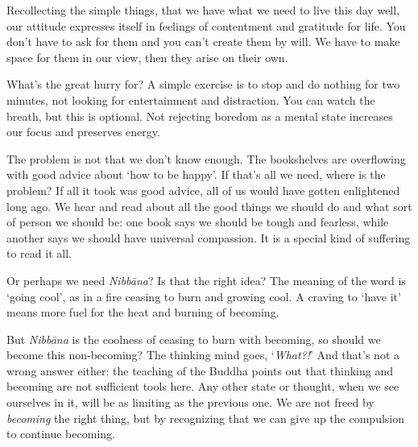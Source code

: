 Recollecting the simple things, that we have what we need to live this
day well, our attitude expresses itself in feelings of contentment and
gratitude for life. You don't have to ask for them and you can't create
them by will. We have to make space for them in our view, then they
arise on their own.

What's the great hurry for? A simple exercise is to stop and do nothing
for two minutes, not looking for entertainment and distraction. You can
watch the breath, but this is optional. Not rejecting boredom as a
mental state increases our focus and preserves energy.

The problem is not that we don't know enough. The bookshelves are
overflowing with good advice about `how to be happy'. If that's all we
need, where is the problem? If all it took was good advice, all of us
would have gotten enlightened long ago. We hear and read about all the
good things we should do and what sort of person we should be: one book
says we should be tough and fearless, while another says we should have
universal compassion. It is a special kind of suffering to read it all.

Or perhaps we need \emph{Nibbāna}? Is that the right idea? The meaning
of the word is `going cool', as in a fire ceasing to burn and growing
cool. A craving to `have it' means more fuel for the heat and burning of
becoming.

But \emph{Nibbāna} is the coolness of ceasing to burn with becoming, so
should we become this non-becoming? The thinking mind goes,
`\emph{What?!}' And that's not a wrong answer either: the teaching of
the Buddha points out that thinking and becoming are not sufficient
tools here. Any other state or thought, when we see ourselves in it,
will be as limiting as the previous one. We are not freed by
\emph{becoming} the right thing, but by recognizing that we can give up
the compulsion to continue becoming.

\clearpage
\figurepagelayout

